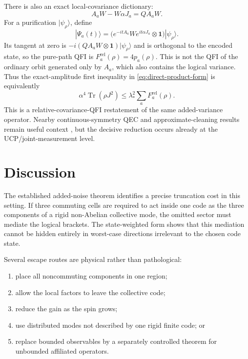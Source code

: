 \documentclass[11pt]{article}
\theoremstyle{remark}
\newcommand{\1}{\mathbf 1}
\newcommand{\Tr}{\operatorname{Tr}}
\begin{document}
There is also an exact local-covariance dictionary:
\[
  A_aW-W\alpha J_a=Q A_aW.
\]
For a purification $|\psi_\rho\rangle$, define
\[
  |\Psi_a(t)\rangle
  =\bigl(e^{-itA_a}W e^{it\alpha J_a}\otimes\1\bigr)
   |\psi_\rho\rangle.
\]
Its tangent at zero is
$-i(Q A_aW\otimes\1)|\psi_\rho\rangle$ and is orthogonal to the encoded
state, so the pure-path QFI is
$F_a^{\mathrm{rel}}(\rho)=4p_a(\rho)$. This is not the QFI of the ordinary
orbit generated only by $A_a$, which also contains the logical variance.
Thus the exact-amplitude first inequality in \cref{eq:direct-product-form} is
equivalently
\begin{equation}
  \alpha^4\Tr(\rho J^2)
  \leq\lambda_*^2\sum_aF_a^{\mathrm{rel}}(\rho).
  \label{eq:qfi-form}
\end{equation}
This is a relative-covariance-QFI restatement of the same added-variance
operator. Nearby continuous-symmetry QEC and approximate-cleaning results
remain useful context
\cite{eastin2009,beny2009,flammia2017,faist2020,zhou2021,liuzhou2021}, but the
decisive reduction occurs already at the UCP/joint-measurement level.

\section{Discussion}
\label{sec:discussion}

The established added-noise theorem identifies a precise truncation cost in
this setting. If three commuting cells
are required to act inside one code as the three components of a rigid
non-Abelian collective mode, the omitted sector must mediate the logical
brackets. The state-weighted form shows that this mediation cannot be hidden
entirely in worst-case directions irrelevant to the chosen code state.

Several escape routes are physical rather than pathological:
\begin{enumerate}[leftmargin=2em]
\item place all noncommuting components in one region;
\item allow the local factors to leave the collective code;
\item reduce the gain as the spin grows;
\item use distributed modes not described by one rigid finite code; or
\item replace bounded observables by a separately controlled theorem for
unbounded affiliated operators.
\end{enumerate}
\end{document}
